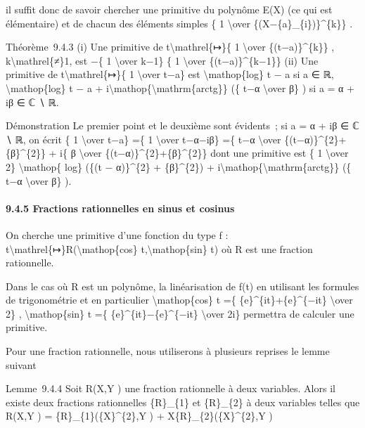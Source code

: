 \documentclass[]{article}
\begin{document}
il suffit donc de savoir chercher une primitive du polynôme E(X) (ce qui
est élémentaire) et de chacun des éléments simples \{ 1
\textbackslash{}over \{(X−\{a\}\_\{i\})\}\^{}\{k\}\} .

Théorème~9.4.3 (i) Une primitive de t\textbackslash{}mathrel\{↦\}\{ 1
\textbackslash{}over \{(t−a)\}\^{}\{k\}\} ,
k\textbackslash{}mathrel\{≠\}1, est −\{ 1 \textbackslash{}over k−1\} \{
1 \textbackslash{}over \{(t−a)\}\^{}\{k−1\}\} (ii) Une primitive de
t\textbackslash{}mathrel\{↦\}\{ 1 \textbackslash{}over t−a\} est
\textbackslash{}mathop\{log\} \textbar{}t − a\textbar{} si a ∈ ℝ,
\textbackslash{}mathop\{log\} \textbar{}t − a\textbar{} +
i\textbackslash{}mathop\{\textbackslash{}mathrm\{arctg\}\} (\{ t−α
\textbackslash{}over β\} ) si a = α + iβ ∈ ℂ ∖ ℝ.

Démonstration Le premier point et le deuxième sont évidents~; si a = α +
iβ ∈ ℂ ∖ ℝ, on écrit \{ 1 \textbackslash{}over t−a\} =\{ 1
\textbackslash{}over t−α−iβ\} =\{ t−α \textbackslash{}over
\{(t−α)\}\^{}\{2\}+\{β\}\^{}\{2\}\} + i\{ β \textbackslash{}over
\{(t−α)\}\^{}\{2\}+\{β\}\^{}\{2\}\} dont une primitive est \{ 1
\textbackslash{}over 2\} \textbackslash{}mathop\{ log\} (\{(t −
α)\}\^{}\{2\} + \{β\}\^{}\{2\}) +
i\textbackslash{}mathop\{\textbackslash{}mathrm\{arctg\}\} (\{ t−α
\textbackslash{}over β\} ).

\paragraph{9.4.5 Fractions rationnelles en sinus et cosinus}

On cherche une primitive d'une fonction du type f :
t\textbackslash{}mathrel\{↦\}R(\textbackslash{}mathop\{cos\}
t,\textbackslash{}mathop\{sin\} t) où R est une fraction rationnelle.

Dans le cas où R est un polynôme, la linéarisation de f(t) en utilisant
les formules de trigonométrie et en particulier
\textbackslash{}mathop\{cos\} t =\{ \{e\}\^{}\{it\}+\{e\}\^{}\{−it\}
\textbackslash{}over 2\} , \textbackslash{}mathop\{sin\} t =\{
\{e\}\^{}\{it\}−\{e\}\^{}\{−it\} \textbackslash{}over 2i\} permettra de
calculer une primitive.

Pour une fraction rationnelle, nous utiliserons à plusieurs reprises le
lemme suivant

Lemme~9.4.4 Soit R(X,Y ) une fraction rationnelle à deux variables.
Alors il existe deux fractions rationnelles \{R\}\_\{1\} et \{R\}\_\{2\}
à deux variables telles que R(X,Y ) = \{R\}\_\{1\}(\{X\}\^{}\{2\},Y ) +
X\{R\}\_\{2\}(\{X\}\^{}\{2\},Y )
\end{document}
